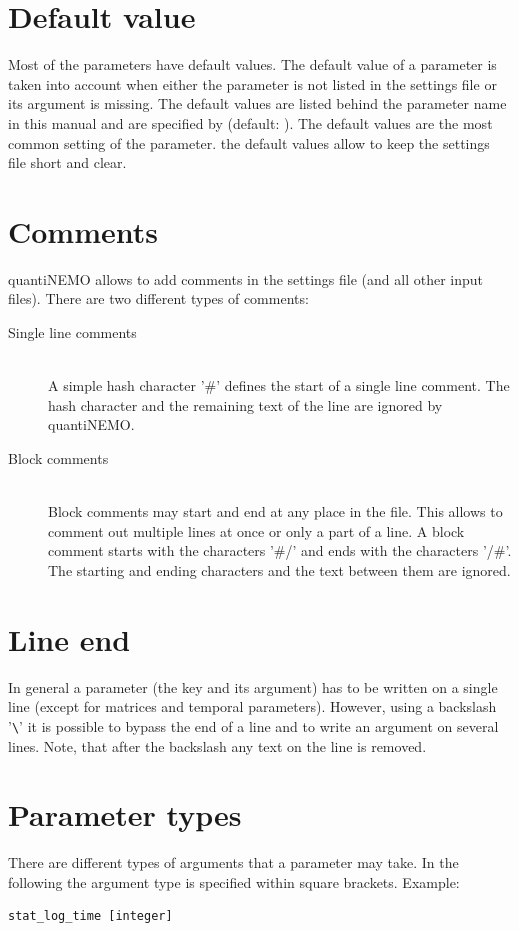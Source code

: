 \documentclass[letterpaper,12pt,oneside]{book}
\begin{document}
\section{Default value}
Most of the parameters have default values. The default value of a parameter is taken into account when either the parameter is not listed in the settings file or its argument is missing. The default values are listed behind the parameter name in this manual and are specified by \textsf{(default: )}. The default values are the most common setting of the parameter. the default values allow to keep the settings file short and clear.  

\section{Comments}
quantiNEMO allows to add comments in the settings file (and all other input files). There are two different types of comments:
\begin{description}
\item[Single line comments]\hspace*{\fill} \index{\#}\\
A simple hash character '\#' defines the start of a single line comment. The hash character and the remaining text of the line are ignored by quantiNEMO.

\item[Block comments]\hspace*{\fill} \\
Block comments may start and end at any place in the file. This allows to comment out multiple lines at once or only a part of a line. A block comment starts with the characters '\#/' and ends with the characters '/\#'. The starting and ending characters and the text between them are ignored.
\end{description}

\section{Line end}
In general a parameter (the key and its argument) has to be written on a single line (except for matrices and temporal parameters). However, using a backslash '\verb"\"' it is possible to bypass the end of a line and to write an argument on several lines. Note, that after the backslash any text on the line is removed. \index{\textbackslash}


\section{Parameter types}
There are different types of arguments that a parameter may take. In the following the argument type is specified within square brackets. Example:
\begin{lstlisting}[frame=single]
stat_log_time [integer]
\end{lstlisting}
\end{document}
